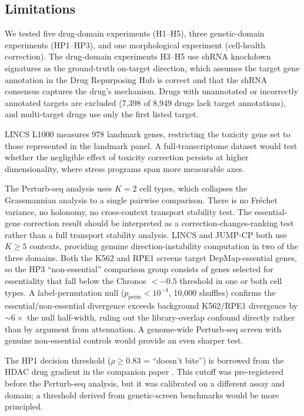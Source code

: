 \documentclass{article}
\begin{document}
\subsection{Limitations}

We tested five drug-domain experiments (H1--H5), three genetic-domain
experiments (HP1--HP3), and one morphological experiment (cell-health
correction). The drug-domain experiments H3--H5 use shRNA knockdown
signatures as the ground-truth on-target direction, which assumes the
target gene annotation in the Drug Repurposing Hub is correct and that
the shRNA consensus captures the drug's mechanism. Drugs with
unannotated or incorrectly annotated targets are excluded (7{,}398 of
8{,}949 drugs lack target annotations), and multi-target drugs use only
the first listed target.

LINCS L1000 measures 978 landmark genes, restricting the toxicity gene set to
those represented in the landmark panel. A full-transcriptome dataset would
test whether the negligible effect of toxicity correction persists at higher
dimensionality, where stress programs span more measurable axes.

The Perturb-seq analysis uses $K = 2$ cell types, which collapses the
Grassmannian analysis to a single pairwise comparison. There is no Fr\'echet
variance, no holonomy, no cross-context transport stability test. The
essential-gene correction result should be interpreted as a
correction-changes-ranking test rather than a full transport stability
analysis. LINCS and JUMP-CP both use $K \geq 5$ contexts, providing
genuine direction-instability computation in two of the three domains.
Both the K562 and RPE1 screens target DepMap-essential genes, so the
HP3 ``non-essential'' comparison group consists of genes selected for
essentiality that fall below the Chronos $< -0.5$ threshold in one or
both cell types. A label-permutation null ($p_{\text{perm}} < 10^{-4}$,
10{,}000 shuffles) confirms the essential/non-essential divergence exceeds
background K562/RPE1 divergence by ${\sim}6\times$ the null half-width,
ruling out the library-overlap confound directly rather than by argument
from attenuation. A genome-wide Perturb-seq screen with genuine
non-essential controls would provide an even sharper test.

The HP1 decision threshold ($\rho \geq 0.83$ = ``doesn't bite'') is
borrowed from the HDAC drug gradient in the companion paper
\citep{tower2026bracket}. This cutoff was pre-registered before
the Perturb-seq analysis, but it was calibrated on a different assay
and domain; a threshold derived from genetic-screen benchmarks would
be more principled.
\end{document}

